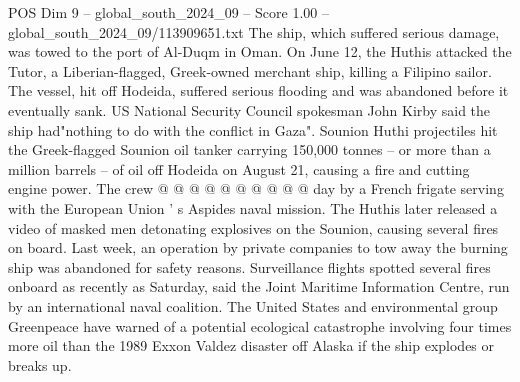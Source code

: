 \begin{textsample}{POS Dim 9 – global\_south\_2024\_09 – Score 1.00 – global\_south\_2024\_09/113909651.txt}
The ship, which suffered serious damage, was towed to the port of Al-Duqm in Oman.
On June 12, the Huthis attacked the Tutor, a Liberian-flagged, Greek-owned merchant ship, killing a Filipino sailor.
The vessel, hit off Hodeida, suffered serious flooding and was abandoned before it eventually sank.
US National Security Council spokesman John Kirby said the ship had"nothing to do with the conflict in Gaza".
Sounion Huthi projectiles hit the Greek-flagged Sounion oil tanker carrying 150,000 tonnes -- or more than a million barrels -- of oil off Hodeida on August 21, causing a fire and cutting engine power.
The crew @ @ @ @ @ @ @ @ @ @ day by a French frigate serving with the European Union ' s Aspides naval mission.
The Huthis later released a video of masked men detonating explosives on the Sounion, causing several fires on board.
Last week, an operation by private companies to tow away the burning ship was abandoned for safety reasons.
Surveillance flights spotted several fires onboard as recently as Saturday, said the Joint Maritime Information Centre, run by an international naval coalition.
The United States and environmental group Greenpeace have warned of a potential ecological catastrophe involving four times more oil than the 1989 Exxon Valdez disaster off Alaska if the ship explodes or breaks up.

\end{textsample}
